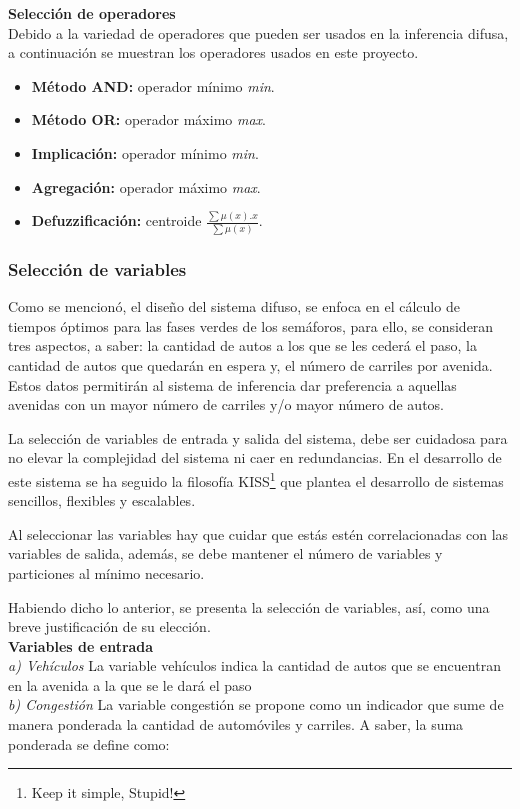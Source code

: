 \textbf{Selección de operadores}\\ 
Debido a la variedad de operadores que pueden ser usados en la inferencia difusa, a continuación se muestran los operadores usados en este proyecto.

\begin{multicols}{2}
\begin{itemize}
	\item \textbf{Método AND:} operador mínimo \emph{min}.
	\item \textbf{Método OR:} operador máximo \emph{max}.
	\item \textbf{Implicación:} operador mínimo \emph{min}.
	\item \textbf{Agregación:} operador máximo \emph{max}.
	\item \textbf{Defuzzificación:} centroide \emph{$\frac{\sum \mu(x).x}{\sum \mu(x)}$}.
\end{itemize}
\end{multicols}
\subsubsection{Selección de variables}
Como se mencionó, el diseño del sistema difuso, se enfoca en el cálculo de tiempos óptimos para las fases verdes de los semáforos, para ello, se consideran tres aspectos, a saber: la cantidad de autos a los que se les cederá el paso, la cantidad de autos que quedarán en espera y, el número de carriles por avenida. Estos datos permitirán al sistema de inferencia dar preferencia a aquellas avenidas con un mayor número de carriles y/o mayor número de autos.

La selección de variables de entrada y salida del sistema, debe ser cuidadosa para no elevar la complejidad del sistema ni caer en redundancias. En el desarrollo de este sistema se ha seguido la filosofía KISS\footnote{Keep it simple, Stupid!} que plantea el desarrollo de sistemas sencillos, flexibles y escalables.

Al seleccionar las variables hay que cuidar que estás estén correlacionadas con las variables de salida, además, se debe mantener el número de variables y particiones al mínimo necesario.

Habiendo dicho lo anterior, se presenta la selección de variables, así, como una breve justificación de su elección. \\

\textbf{Variables de entrada}\\
\textit{a) Vehículos} La variable vehículos indica la cantidad de autos que se encuentran en la avenida a la que se le dará el paso\\
\textit{b) Congestión} La variable congestión se propone como un indicador que sume de manera ponderada la cantidad de automóviles y carriles. A saber, la suma ponderada se define como:

